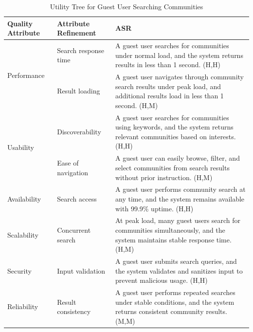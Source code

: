 \documentclass{article}
\begin{document}
\begin{table}[H]
    \centering
    \caption{Utility Tree for Guest User Searching Communities}
    \begin{tabular}{|p{3cm}|p{4cm}|p{7cm}|}
        \hline
        \textbf{Quality Attribute} & \textbf{Attribute Refinement}                                                                                                     & \textbf{ASR} \\
        \hline

        \multirow{2}{*}{Performance}
                                   & Search response time
                                   & A guest user searches for communities under normal load, and the system returns results in less than 1 second. (H,H)                             \\
        \cline{2-3}
                                   & Result loading
                                   & A guest user navigates through community search results under peak load, and additional results load in less than 1 second. (H,M)                \\
        \hline

        \multirow{2}{*}{Usability}
                                   & Discoverability
                                   & A guest user searches for communities using keywords, and the system returns relevant communities based on interests. (H,H)                      \\
        \cline{2-3}
                                   & Ease of navigation
                                   & A guest user can easily browse, filter, and select communities from search results without prior instruction. (H,M)                              \\
        \hline

        Availability
                                   & Search access
                                   & A guest user performs community search at any time, and the system remains available with 99.9\% uptime. (H,H)                                   \\
        \hline

        Scalability
                                   & Concurrent search
                                   & At peak load, many guest users search for communities simultaneously, and the system maintains stable response time. (H,M)                       \\
        \hline

        Security
                                   & Input validation
                                   & A guest user submits search queries, and the system validates and sanitizes input to prevent malicious usage. (H,H)                              \\
        \hline

        Reliability
                                   & Result consistency
                                   & A guest user performs repeated searches under stable conditions, and the system returns consistent community results. (M,M)                      \\
        \hline
    \end{tabular}
\end{table}
\end{document}
